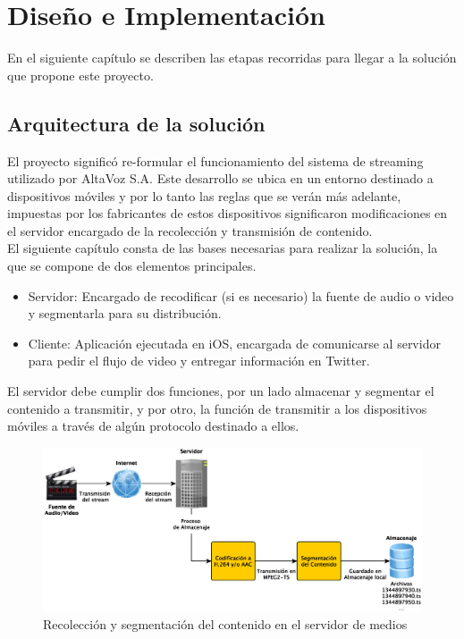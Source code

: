 \chapter{Diseño e Implementación}
En el siguiente capítulo se describen las etapas recorridas para llegar a la solución que propone este proyecto.
\section{Arquitectura de la solución}

El proyecto significó re-formular el funcionamiento del sistema de streaming utilizado por AltaVoz S.A. Este desarrollo se ubica en un entorno destinado a dispositivos móviles y por lo tanto las reglas que se verán más adelante, impuestas por los fabricantes de estos dispositivos significaron modificaciones en el servidor encargado de la recolección y transmisión de contenido.\\

El siguiente capítulo consta de las bases necesarias para realizar la solución, la que se compone de dos elementos principales. 
\begin{itemize}
\item Servidor: Encargado de recodificar (si es necesario) la fuente de audio o video y segmentarla para su distribución.
\item Cliente: Aplicación ejecutada en iOS, encargada de comunicarse al servidor para pedir el flujo de video y entregar información en Twitter.
\end{itemize}

El servidor debe cumplir dos funciones, por un lado almacenar y segmentar el contenido a transmitir, y por otro, la función de transmitir a los dispositivos móviles a través de algún protocolo destinado a ellos.\\

\begin{figure}[H]
	\centering
	\includegraphics[scale=0.48]{imgs/diagrama-Segmenter-Tedit.eps}
	\caption{Recolección y segmentación del contenido en el servidor de medios}
	\label{diagramaSegmenter}
\end{figure}

